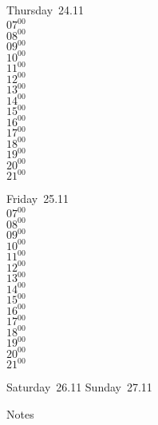\documentclass[11pt,a4paper]{book}\usepackage[]{graphicx}\usepackage[]{color}
\begin{document}
\clearpage
\begin{headerbox}
\end{headerbox}
\begin{weekdaybox}
  Thursday~24.11\\
  { 
  \vfill
  $07^{00}$\\
$08^{00}$\\
$09^{00}$\\
$10^{00}$\\
$11^{00}$\\
$12^{00}$\\
$13^{00}$\\
$14^{00}$\\
$15^{00}$\\
$16^{00}$\\
$17^{00}$\\
$18^{00}$\\
$19^{00}$\\
$20^{00}$\\
$21^{00}$\\
  }
\end{weekdaybox} 
\begin{weekdaybox}
  Friday~25.11\\
  { 
  \vfill
  $07^{00}$\\
$08^{00}$\\
$09^{00}$\\
$10^{00}$\\
$11^{00}$\\
$12^{00}$\\
$13^{00}$\\
$14^{00}$\\
$15^{00}$\\
$16^{00}$\\
$17^{00}$\\
$18^{00}$\\
$19^{00}$\\
$20^{00}$\\
$21^{00}$\\
  }
\end{weekdaybox}
\begin{weekendbox}
  Saturday~26.11
  \tcblower
  Sunday~27.11
\end{weekendbox} %
\begin{notebox}
  Notes
\end{notebox}
\clearpage
\end{document}
